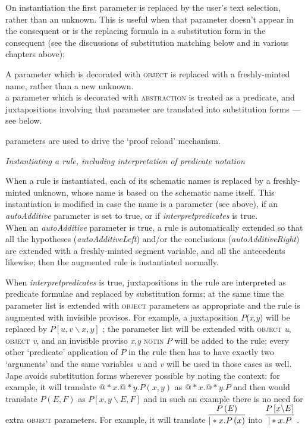 {\textbullet}\tab On instantiation the first parameter is replaced by the user's text selection, rather than an unknown. This is useful when that parameter doesn't appear in the consequent or is the replacing formula in a substitution form in the consequent (see the discussions of substitution matching below and in various chapters above);


{\textbullet}\tab A parameter which is decorated with \textsc{object} is replaced with a freshly-minted name, rather than a new unknown.\\
{\textbullet}\tab a parameter which is decorated with \textsc{abstraction} is treated as a predicate, and juxtapositions involving that parameter are translated into substitution forms --- see below.


{\textbullet}\tab parameters are used to drive the `proof reload' mechanism.


\textit{Instantiating a rule, including interpretation of predicate notation}


When a rule is instantiated, each of its schematic names is replaced by a freshly-minted unknown, whose name is based on the schematic name itself. This instantiation is modified in case the name is a parameter (see above), if an \textit{autoAdditive} parameter is set to true, or if \textit{interpretpredicates} is true.\\
When an \textit{autoAdditive} parameter is true, a rule is automatically extended so that all the hypotheses (\textit{autoAdditiveLeft}) and/or the conclusions (\textit{autoAdditiveRight}) are extended with a freshly-minted segment variable, and all the antecedents likewise; then the augmented rule is instantiated normally.


When \textit{interpretpredicates} is true, juxtapositions in the rule are interpreted as predicate formulae and replaced by substitution forms; at the same time the parameter list is extended with \textsc{object} parameters as appropriate and the rule is augmented with invisible provisos. For example, a juxtaposition $P$(\textit{x},\textit{y}) will be replaced by $P\left[ u,v\backslash x,y\right] $ ; the parameter list will be extended with \textsc{object} \textit{u}, \textsc{object} \textit{v}, and an invisible proviso \textit{x,y} \textsc{notin} $P$ will be added to the rule; every other `predicate' application of $P$ in the rule then has to have exactly two `arguments' and the same variables \textit{u} and \textit{v} will be used in those cases as well. Jape avoids substitution forms wherever possible by noting the context: for example, it will translate $@*x.@*y.P\left( x,y\right) $ as $@*x.@*y.P$ and then would translate $P\left( E,F\right) $ as $P\left[ x,y\backslash E,F\right] $ and in such an example there is no need for extra \textsc{object} parameters. For example, it will translate $\infer{|*x.P\left( x\right) }
       {P\left( E\right) }$ into $\infer{|*x.P}
       {P\left[ x\backslash E\right] }$ .


